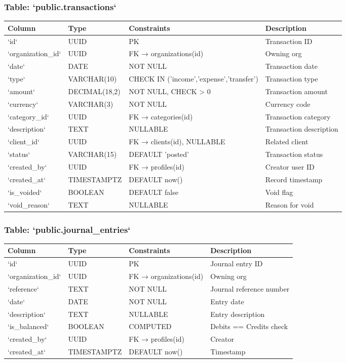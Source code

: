 \documentclass[journal, a4paper, onecolumn, 12pt]{IEEEtran}
\begin{document}
\subsubsection{Table: `public.transactions`}
\begin{longtable}{|p{}|p{}|p{}|p{}|}
\hline
Column & Type & Constraints & Description \\ \hline
\hline
`id` & UUID & PK & Transaction ID \\ \hline
`organization\_id` & UUID & FK → organizations(id) & Owning org \\ \hline
`date` & DATE & NOT NULL & Transaction date \\ \hline
`type` & VARCHAR(10) & CHECK IN ('income','expense','transfer') & Transaction type \\ \hline
`amount` & DECIMAL(18,2) & NOT NULL, CHECK > 0 & Transaction amount \\ \hline
`currency` & VARCHAR(3) & NOT NULL & Currency code \\ \hline
`category\_id` & UUID & FK → categories(id) & Transaction category \\ \hline
`description` & TEXT & NULLABLE & Transaction description \\ \hline
`client\_id` & UUID & FK → clients(id), NULLABLE & Related client \\ \hline
`status` & VARCHAR(15) & DEFAULT 'posted' & Transaction status \\ \hline
`created\_by` & UUID & FK → profiles(id) & Creator user ID \\ \hline
`created\_at` & TIMESTAMPTZ & DEFAULT now() & Record timestamp \\ \hline
`is\_voided` & BOOLEAN & DEFAULT false & Void flag \\ \hline
`void\_reason` & TEXT & NULLABLE & Reason for void \\ \hline
\end{longtable}
\subsubsection{Table: `public.journal\_entries`}
\begin{longtable}{|p{}|p{}|p{}|p{}|}
\hline
Column & Type & Constraints & Description \\ \hline
\hline
`id` & UUID & PK & Journal entry ID \\ \hline
`organization\_id` & UUID & FK → organizations(id) & Owning org \\ \hline
`reference` & TEXT & NOT NULL & Journal reference number \\ \hline
`date` & DATE & NOT NULL & Entry date \\ \hline
`description` & TEXT & NULLABLE & Entry description \\ \hline
`is\_balanced` & BOOLEAN & COMPUTED & Debits == Credits check \\ \hline
`created\_by` & UUID & FK → profiles(id) & Creator \\ \hline
`created\_at` & TIMESTAMPTZ & DEFAULT now() & Timestamp \\ \hline
\end{longtable}
\end{document}
